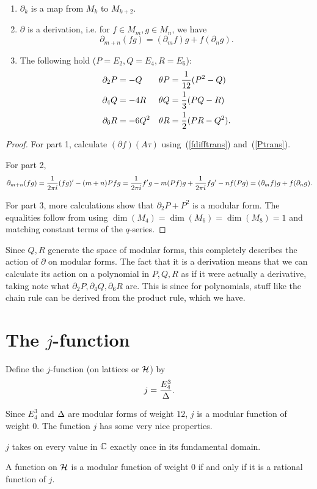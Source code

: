 \begin{thm}$\,$
\begin{enumerate}
\item
$\partial_k$ is a map from $M_k$ to $M_{k+2}$.
\item
$\partial$ is a derivation, i.e. for $f\in M_m,g\in M_n$, we have
\[
\partial_{m+n}(fg)=(\partial_m f)g+f(\partial_n g).
\]
\item The following hold ($P=E_2,Q=E_4,R=E_6$):
\begin{align*}
\partial_2P&=-Q&\theta P&=\rc{12}(P^2-Q)\\
\partial_4Q&=-4R&\theta Q&=\rc{3}(PQ-R)\\
\partial_6R&=-6Q^2&\theta R&=\rc{2}(PR-Q^2).
\end{align*}
\end{enumerate}
\end{thm}
\begin{proof}
For part 1, calculate $(\partial f)(A\tau)$ using~(\ref{fdifftrans}) and~(\ref{Ptrans}).

For part 2,
\[
\partial_{m+n}(fg)=\rc{2\pi i} (fg)'-(m+n)Pfg=\rc{2\pi i}f'g-m(Pf)g+\rc{2\pi i}fg'-nf(Pg)=(\partial_mf)g+f(\partial_n g).
\]

For part 3, 
more calculations show that $\partial_2P+P^2$ is a modular form. The equalities follow from using $\dim(M_4)=\dim(M_6)=\dim(M_8)=1$ and matching constant terms of the $q$-series.
\end{proof}
\begin{rem}
Since $Q,R$ generate the space of modular forms, this completely describes the action of $\partial$ on modular forms. The fact that it is a derivation means that we can calculate its action on a polynomial in $P,Q,R$ as if it were actually a derivative, taking note what $\partial_2P,\partial_4Q,\partial_6R$ are. This is since for polynomials, stuff like the chain rule can be derived from the product rule, which we have.
\end{rem}
%
\section{The $j$-function}
\begin{df}
Define the $j$-function (on lattices or $\cal H$) by
\[
j=\frac{E_4^3}{\De}.\]
\end{df}
Since $E_4^3$ and $\De$ are modular forms of weight $12$, $j$ is a modular function of weight $0$. The function $j$ has some very nice properties.

\begin{thm}
$j$ takes on every value in $\C$ exactly once in its fundamental domain. 
\end{thm}
\begin{thm}
A function on $\cal H$ is a modular function of weight 0 if and only if it is a rational function of $j$.
\end{thm}
%
